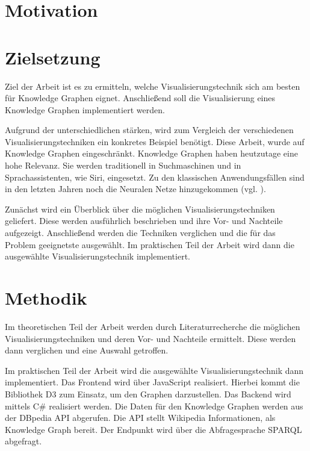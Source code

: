 \section{Motivation}
\section{Zielsetzung}

Ziel der Arbeit ist es zu ermitteln, welche Visualisierungstechnik sich am besten für Knowledge Graphen eignet. Anschließend soll die Visualisierung eines Knowledge Graphen implementiert werden.

Aufgrund der unterschiedlichen stärken, wird zum Vergleich der verschiedenen Visualisierungstechniken ein konkretes Beispiel benötigt. Diese Arbeit, wurde auf Knowledge Graphen eingeschränkt. Knowledge Graphen haben heutzutage eine hohe Relevanz. Sie werden traditionell in Suchmaschinen und in Sprachassistenten, wie Siri, eingesetzt. Zu den klassischen Anwendungsfällen sind in den letzten Jahren noch die Neuralen Netze hinzugekommen (vgl. \cite{wiki:KnowledgeGraph}).

Zunächst wird ein Überblick über die möglichen Visualisierungstechniken geliefert. Diese werden ausführlich beschrieben und ihre Vor- und Nachteile aufgezeigt. Anschließend werden die Techniken verglichen und die für das Problem geeignetste ausgewählt. Im praktischen Teil der Arbeit wird dann die ausgewählte Visualisierungstechnik implementiert. 

\section{Methodik}

Im theoretischen Teil der Arbeit werden durch Literaturrecherche die möglichen Visualisierungstechniken und deren Vor- und Nachteile ermittelt. Diese werden dann verglichen und eine Auswahl getroffen.

Im praktischen Teil der Arbeit wird die ausgewählte Visualisierungstechnik dann implementiert. Das Frontend wird über JavaScript realisiert. Hierbei kommt die Bibliothek D3 zum Einsatz, um den Graphen darzustellen. Das Backend wird mittels C\# realisiert werden. Die Daten für den Knowledge Graphen werden aus der DBpedia API abgerufen. Die API stellt Wikipedia Informationen, als Knowledge Graph bereit. Der Endpunkt wird über die Abfragesprache \ac{SPARQL} abgefragt.


